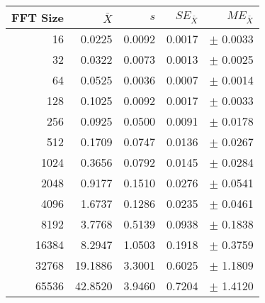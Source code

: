 \begin{tabular}{|r|r|r|r|r|}\hline
    FFT Size & $\bar{X}$ & $s$ & $SE_{\bar{X}}$ & $ME_{\bar{X}}$ \\ \hline
    16 & 0.0225 & 0.0092 & 0.0017 & $\pm$ 0.0033 \\ \hline
    32 & 0.0322 & 0.0073 & 0.0013 & $\pm$ 0.0025 \\ \hline
    64 & 0.0525 & 0.0036 & 0.0007 & $\pm$ 0.0014 \\ \hline
    128 & 0.1025 & 0.0092 & 0.0017 & $\pm$ 0.0033 \\ \hline
    256 & 0.0925 & 0.0500 & 0.0091 & $\pm$ 0.0178 \\ \hline
    512 & 0.1709 & 0.0747 & 0.0136 & $\pm$ 0.0267 \\ \hline
    1024 & 0.3656 & 0.0792 & 0.0145 & $\pm$ 0.0284 \\ \hline
    2048 & 0.9177 & 0.1510 & 0.0276 & $\pm$ 0.0541 \\ \hline
    4096 & 1.6737 & 0.1286 & 0.0235 & $\pm$ 0.0461 \\ \hline
    8192 & 3.7768 & 0.5139 & 0.0938 & $\pm$ 0.1838 \\ \hline
    16384 & 8.2947 & 1.0503 & 0.1918 & $\pm$ 0.3759 \\ \hline
    32768 & 19.1886 & 3.3001 & 0.6025 & $\pm$ 1.1809 \\ \hline
    65536 & 42.8520 & 3.9460 & 0.7204 & $\pm$ 1.4120 \\ \hline
\end{tabular}
